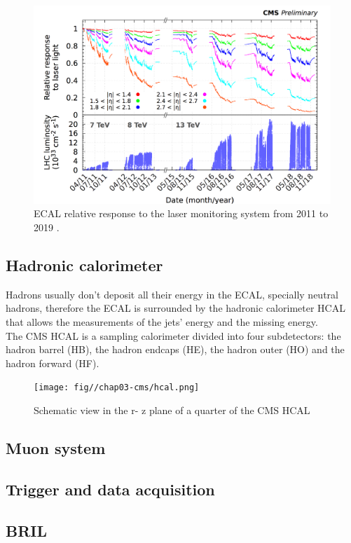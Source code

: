 \begin{figure}[h!]
    \centering
    \includegraphics[width=0.85\linewidth]{fig//chap03-cms/rad_damage.png}
    \caption{ECAL relative response to the laser monitoring system from 2011 to 2019 \cite{EcalDPGResultsCMSDPS2019005TWiki}.}
    \label{fig:ecal_rad_damage}
\end{figure}

\subsection{Hadronic calorimeter}
Hadrons usually don't deposit all their energy in the ECAL, specially neutral hadrons, therefore the ECAL is surrounded by the hadronic calorimeter HCAL that allows the measurements of the jets' energy and the missing energy.\\
The CMS HCAL \ADDREF is a sampling calorimeter divided into four subdetectors: the hadron barrel (HB), the hadron endcaps (HE), the hadron outer (HO) and the hadron forward (HF).





\begin{figure}[h!]
    \centering
    \texttt{[image: fig//chap03-cms/hcal.png]}
    \caption{Schematic view in the r- z plane of a quarter of the CMS HCAL }
    \label{fig:hcal}
\end{figure}
\subsection{Muon system}
\subsection{Trigger and data acquisition}
\subsection{BRIL}